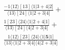 \documentclass[varwidth, border=5pt]{standalone}
\begin{document}
\begin{my}
$\begin{gathered}
\scriptscriptstyle\frac{-1⟨12⟩[13]⟨1|3+4|2]}{⟨13⟩[24]⟨1|2+3|4]} +\\
\scriptscriptstyle\frac{1[23]⟨24⟩⟨1|2+4|1]}{⟨13⟩[24]⟨4|2+3|4]} +\\
\scriptscriptstyle\frac{1⟨12⟩[23]⟨24⟩⟨1|𝟓|1]}{⟨13⟩⟨1|2+3|4]⟨4|2+3|4]} \phantom{+}
\end{gathered}$
\end{my}
\end{document}
